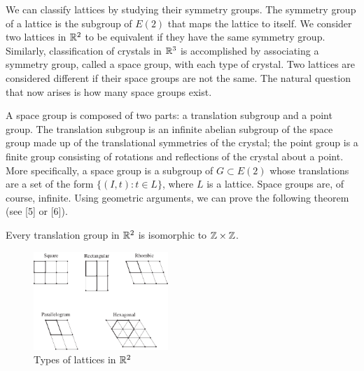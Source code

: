  
We can classify lattices by studying their symmetry groups. The
symmetry group of a lattice is the subgroup of $E(2)$ that maps the
lattice to itself. We consider two lattices in ${\Bbb R}^2$ to be
equivalent if they have the same symmetry group.  Similarly,
classification of crystals in ${\Bbb R}^3$ is accomplished by
associating a symmetry group, called a {\bfi space group}, with each
type of crystal. Two lattices are considered
different if their space groups are not the same.  The natural
question that now arises is how many space groups exist. 
 
 
A space group is composed of two parts: a {\bfi translation
subgroup\/} and a {\bfi point
group}.  The translation subgroup is an infinite
abelian subgroup of the space group made up of the translational
symmetries of the crystal; the point group is a finite group 
consisting  of rotations and reflections of the crystal about a point.
More specifically, a space group is a subgroup of $G \subset E(2)$
whose translations are a set of the form $\{ (I, t) : t \in L \}$,
where $L$ is a lattice. Space groups are, of course, infinite. Using
geometric arguments, we can prove the following theorem (see [5] or [6]).
 
 
 
 
\begin{theorem}
Every translation group in ${\Bbb R}^2$ is isomorphic to ${\Bbb Z}
\times {\Bbb Z}$.
\end{theorem}
 
 
\begin{figure}[bht]
\begin{center}
\centerline {
\includegraphics[width=2in]{TypeLattice}
}
\end{center}
\caption{Types of lattices in  ${\Bbb R}^2$}
\label{Types}
\end{figure}
 
